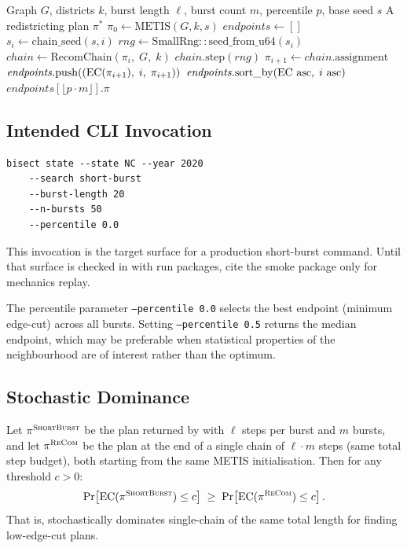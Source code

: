 \begin{algorithm}[H]
\caption{\shb{} Plan Selection}
\label{alg:short-burst}
\begin{algorithmic}[1]
\Require Graph $G$, districts $k$, burst length $\ell$, burst count $m$,
         percentile $p$, base seed $s$
\Ensure A redistricting plan $\pi^*$
\State $\pi_0 \gets \mathrm{METIS}(G, k, s)$
\State $\mathit{endpoints} \gets []$
  \State $s_i \gets \mathrm{chain\_seed}(s, i)$
  \State $\mathit{rng} \gets \mathrm{SmallRng::seed\_from\_u64}(s_i)$
  \State $\mathit{chain} \gets \mathrm{RecomChain}(\pi_i,\; G,\; k)$
    \State $\mathit{chain}.\mathrm{step}(\mathit{rng})$
  \EndFor
  \State $\pi_{i+1} \gets \mathit{chain}.\mathrm{assignment}$
  \State $\mathit{endpoints}.\mathrm{push}\!\left((\mathrm{EC}(\pi_{i+1}),\; i,\; \pi_{i+1})\right)$
\EndFor
\State $\mathit{endpoints}.\mathrm{sort\_by}\!\left(\mathrm{EC} \text{ asc},\; i \text{ asc}\right)$
\State \Return $\mathit{endpoints}[\lfloor p \cdot m \rfloor].\pi$
\end{algorithmic}
\end{algorithm}

\subsection{Intended CLI Invocation}

\begin{verbatim}
bisect state --state NC --year 2020
    --search short-burst
    --burst-length 20
    --n-bursts 50
    --percentile 0.0
\end{verbatim}

This invocation is the target surface for a production short-burst command.
Until that surface is checked in with run packages, cite the smoke package only
for mechanics replay.

The percentile parameter \texttt{--percentile 0.0} selects the best
endpoint (minimum edge-cut) across all bursts.
Setting \texttt{--percentile 0.5} returns the median endpoint, which
may be preferable when statistical properties of the neighbourhood are
of interest rather than the optimum.

\subsection{Stochastic Dominance}

\begin{proposition}
\label{thm:dominance}
Let $\pi^{\textsc{ShortBurst}}$ be the plan returned by \shb{} with $\ell$ steps per
burst and $m$ bursts, and let $\pi^{\textsc{ReCom}}$ be the plan at the end
of a single \recom{} chain of $\ell \cdot m$ steps (same total step
budget), both starting from the same METIS initialisation.
Then for any threshold $c > 0$:
\[
  \Pr\!\left[\mathrm{EC}(\pi^{\textsc{ShortBurst}}) \leq c\right]
  \;\geq\;
  \Pr\!\left[\mathrm{EC}(\pi^{\textsc{ReCom}}) \leq c\right].
\]
That is, \shb{} stochastically dominates single-chain \recom{} of the
same total length for finding low-edge-cut plans.
\end{proposition}

